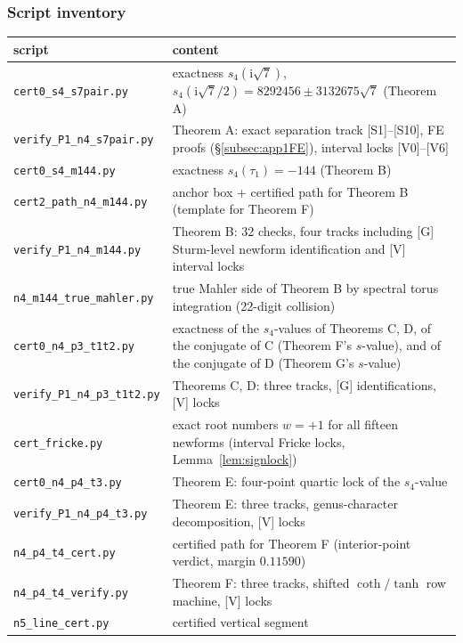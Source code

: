 \documentclass[11pt]{article}
\newcommand{\ii}{\mathrm{i}}
\theoremstyle{definition}
\theoremstyle{remark}
\begin{document}
\subsubsection{Script inventory}\label{subsec:scripts}

\begin{center}\footnotesize
\begin{tabular}{lp{9.6cm}}
\toprule
script & content \\
\midrule
\texttt{cert0\_s4\_s7pair.py} & exactness $s_4(\ii\sqrt7)$,
  $s_4(\ii\sqrt7/2)=8292456\pm3132675\sqrt7$ (Theorem A) \\
\texttt{verify\_P1\_n4\_s7pair.py} & Theorem A: exact separation
  track [S1]--[S10], FE proofs (\S\ref{subsec:app1FE}), interval
  locks [V0]--[V6] \\
\texttt{cert0\_s4\_m144.py} & exactness $s_4(\tau_1)=-144$
  (Theorem B) \\
\texttt{cert2\_path\_n4\_m144.py} & anchor box + certified path for
  Theorem B (template for Theorem F) \\
\texttt{verify\_P1\_n4\_m144.py} & Theorem B: 32 checks, four tracks
  including [G] Sturm-level newform identification and [V] interval
  locks \\
\texttt{n4\_m144\_true\_mahler.py} & true Mahler side of
  Theorem B by spectral torus integration (22-digit collision) \\
\texttt{cert0\_n4\_p3\_t1t2.py} & exactness of the $s_4$-values of
  Theorems C, D, of the conjugate of C (Theorem F's $s$-value), and
  of the conjugate of D (Theorem G's $s$-value) \\
\texttt{verify\_P1\_n4\_p3\_t1t2.py} & Theorems C, D: three tracks,
  [G] identifications, [V] locks \\
\texttt{cert\_fricke.py} & exact root numbers $w=+1$ for all fifteen
  newforms (interval Fricke locks, Lemma~\ref{lem:signlock}) \\
\texttt{cert0\_n4\_p4\_t3.py} & Theorem E: four-point quartic lock
  of the $s_4$-value \\
\texttt{verify\_P1\_n4\_p4\_t3.py} & Theorem E: three tracks,
  genus-character decomposition, [V] locks \\
\texttt{n4\_p4\_t4\_cert.py} & certified path for Theorem F
  (interior-point verdict, margin $0.11590$) \\
\texttt{n4\_p4\_t4\_verify.py} & Theorem F: three tracks, shifted
  $\coth/\tanh$ row machine, [V] locks \\
\texttt{n5\_line\_cert.py} & certified vertical segment

\end{tabular}
\end{center}
\end{document}
